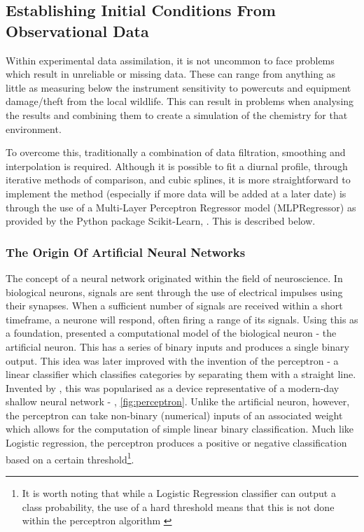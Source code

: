 \subsection{Establishing Initial Conditions From Observational Data}
Within experimental data assimilation, it is not uncommon to face problems which result in unreliable or missing data. These can range from anything as little as measuring below the instrument sensitivity to powercuts and equipment damage/theft from the local wildlife. This can result in problems when analysing the results and combining them to create a simulation of the chemistry for that environment.

To overcome this, traditionally a combination of data filtration, smoothing and interpolation is required. Although it is possible to fit a diurnal profile, through iterative methods of comparison, and cubic splines, it is more straightforward to implement the method (especially if more data will be added at a later date) is through the use of a Multi-Layer Perceptron Regressor model (MLPRegressor) as provided by the Python package Scikit-Learn, \citep{sklearn}. This is described below.

\subsubsection{The Origin Of Artificial Neural Networks}
The concept of a neural network originated within the field of neuroscience. In biological neurons, signals are sent through the use of electrical impulses using their synapses. When a sufficient number of signals are received within a short timeframe, a neurone will respond, often firing a range of its signals. Using this as a foundation, \cite{pitts} presented a computational model of the biological neuron - the artificial neuron. This has a series of binary inputs and produces a single binary output. This idea was later improved with the invention of the perceptron - a linear classifier which classifies categories by separating them with a straight line. Invented by \cite{perceptron}, this was popularised as a device representative of a modern-day shallow neural network - \citep{perceptronmanual}, \autoref{fig:perceptron}. Unlike the artificial neuron, however, the perceptron can take non-binary (numerical) inputs of an associated weight which allows for the computation of simple linear binary classification. Much like Logistic regression, the perceptron produces a positive or negative classification based on a certain threshold\footnote{It is worth noting that while a Logistic Regression classifier can output a class probability, the use of a hard threshold means that this is not done within the perceptron algorithm \citep{handsonml}}.


